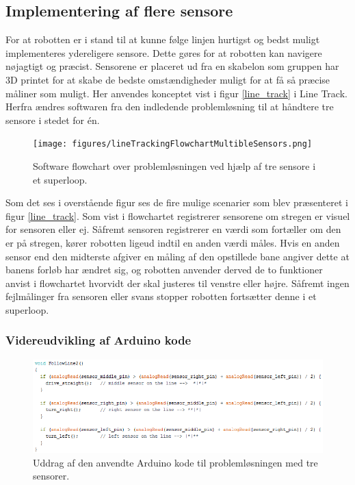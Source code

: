 \subsection*{Implementering af flere sensore}
For at robotten er i stand til at kunne følge linjen hurtigst og bedst muligt implementeres ydereligere sensore. Dette gøres for at robotten kan navigere nøjagtigt og præcist. Sensorene er placeret ud fra en skabelon som gruppen har 3D printet for at skabe de bedste omstændigheder muligt for at få så præcise måliner som muligt.
\newline 
Her anvendes konceptet vist i figur \ref{line_track} i Line Track. Herfra ændres softwaren fra den indledende problemløsning til at håndtere tre sensore i stedet for én. 

\begin{figure}[h!]
  \centering
  \texttt{[image: figures/lineTrackingFlowchartMultibleSensors.png]}
  \caption{Software flowchart over problemløsningen ved hjælp af tre sensore i et superloop.}
  \label{flowchart_flere_sensorer}
\end{figure}
\newpage

Som det ses i overstående figur ses de fire mulige scenarier som blev præsenteret i figur \ref{line_track}.
Som vist i flowchartet registrerer sensorene om stregen er visuel for sensoren eller ej. Såfremt sensoren registrerer en værdi som fortæller om den er på stregen, kører robotten ligeud indtil en anden værdi måles. 
\newline 
Hvis en anden sensor end den midterste afgiver en måling af den opstillede bane angiver dette at banens forløb har ændret sig, og robotten anvender derved de to funktioner anvist i flowchartet hvorvidt der skal justeres til venstre eller højre. 
\newline
Såfremt ingen fejlmålinger fra sensoren eller svans stopper robotten fortsætter denne i et superloop.
\newpage

\subsubsection{Videreudvikling af Arduino kode}
\begin{figure}[h!]
  \centering
  \includegraphics[width=1.0\textwidth]{figures/followLine3.png}
  \caption{Uddrag af den anvendte Arduino kode til problemløsningen med tre sensorer.}
  \label{tre_sensore_followline}
\end{figure}
\newpage

 

